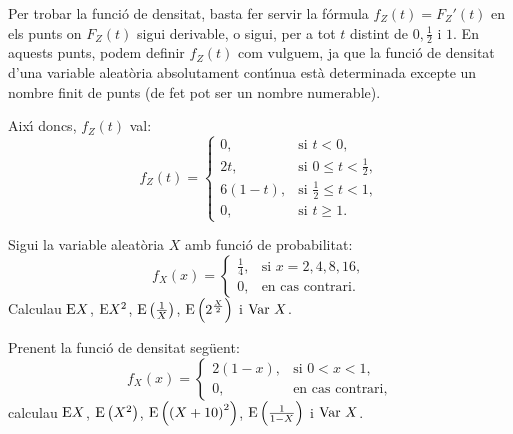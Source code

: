 {Per trobar la funci\'o de densitat, basta fer servir la f\'ormula
$f_Z (t)= F_Z'(t)$ en els punts on $F_Z (t)$ sigui derivable, o sigui,
per a tot $t$ distint de $0,\frac{1}{2}$ i $1$.
En aquests punts, podem definir $f_Z (t)$ com vulguem, ja que 
la funci\'o de densitat d'una variable aleat\`oria absolutament
cont\'{\i}nua est\`a determinada excepte un nombre finit de punts
(de fet pot ser un nombre numerable).

Aix\'{\i} doncs, $f_Z (t)$ val:
$$
f_Z (t)=
\left\{\begin{array}{ll}
0, & \text{si $t<0$}, \\
2 t, & \text{si $0\leq t <\frac{1}{2}$}, \\
6 (1-t), & \text{si $\frac{1}{2}\leq t <1$}, \\ 
0, & \text{si $t\geq 1$}. 
\end{array}\right.
$$
}

\begin{probres}
{Sigui la variable aleat\`oria 
$X$ amb funci\'o de probabilitat:
$$f_X(x)=
\left\{\begin{array}{ll}
\frac{1}{4}, & \text{si $x=2,4,8,16$},\\ 0, & \text{
en cas contrari.}
\end{array}\right.$$
Calculau ${\rm E} X$, ${\rm E} X^2$, ${\rm E}\left(\frac{1}{X}\right)$, 
${\rm E}\left(2^{\frac{X}{2}}\right)$ i $\hbox{Var }X$.}
\end{probres}


\begin{probres}
{Prenent la funci\'o de densitat seg\"uent:
$$f_X(x)=
\left\{\begin{array}{ll}
2(1-x), & \text{si $0<x<1$},\\ 0, & \text{en cas contrari},
\end{array}\right.$$calculau 
${\rm E} X$, ${\rm E}\left( X^2 \right)$, ${\rm E}\left( {(X+10)}^2\right)$, 
${\rm E}\left( {1\over 1-X}\right)$ i $\hbox{Var }X$.}
\end{probres}

